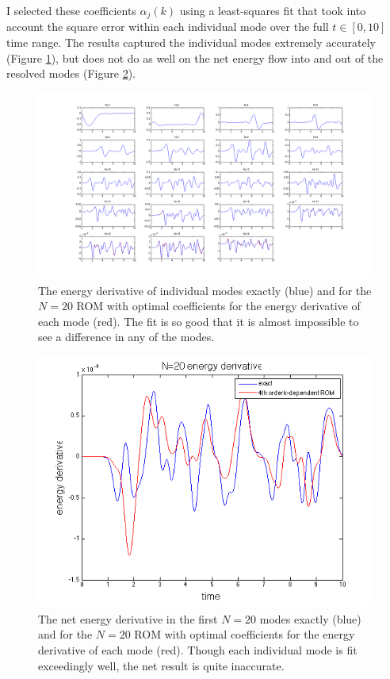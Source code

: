 \documentclass{article}
\begin{document}
I selected these coefficients $\alpha_j(k)$ using a least-squares fit that took into account the square error within each individual mode over the full $t\in[0,10]$ time range. The results captured the individual modes extremely accurately (Figure \ref{fig:individual_modes_k}), but does not do as well on the net energy flow into and out of the resolved modes (Figure \ref{fig:k_dependent_net}).

\begin{figure}[h]
\includegraphics[width=\textwidth]{individual_modes_k.png}
\caption{The energy derivative of individual modes exactly (blue) and for the $N=20$ ROM with optimal coefficients for the energy derivative of each mode (red). The fit is so good that it is almost impossible to see a difference in any of the modes.}\label{fig:individual_modes_k}
\end{figure}

\begin{figure}[h]
\includegraphics[width=\textwidth]{k_dependent_20.png}
\caption{The net energy derivative in the first $N=20$ modes exactly (blue) and for the $N=20$ ROM with optimal coefficients for the energy derivative of each mode (red). Though each individual mode is fit exceedingly well, the net result is quite inaccurate.}\label{fig:k_dependent_net}
\end{figure}
\end{document}
